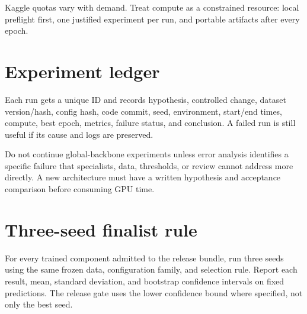 Kaggle quotas vary with demand. Treat compute as a constrained resource: local preflight first, one justified experiment per run, and portable artifacts after every epoch.

\section{Experiment ledger}

Each run gets a unique ID and records hypothesis, controlled change, dataset version/hash, config hash, code commit, seed, environment, start/end times, compute, best epoch, metrics, failure status, and conclusion. A failed run is still useful if its cause and logs are preserved.

\begin{actionbox}
Do not continue global-backbone experiments unless error analysis identifies a specific failure that specialists, data, thresholds, or review cannot address more directly. A new architecture must have a written hypothesis and acceptance comparison before consuming GPU time.
\end{actionbox}

\section{Three-seed finalist rule}

For every trained component admitted to the release bundle, run three seeds using the same frozen data, configuration family, and selection rule. Report each result, mean, standard deviation, and bootstrap confidence intervals on fixed predictions. The release gate uses the lower confidence bound where specified, not only the best seed.

